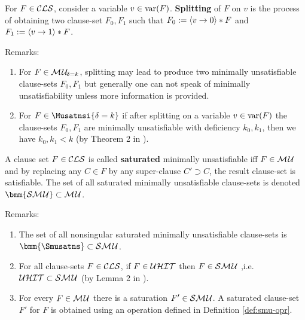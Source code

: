 \documentclass{article}
\begin{document}
\begin{defi}\label{def:splitting}
For $F \in \mathcal{CLS}$, consider a variable $v \in \operatorname{var}(F)$. \textbf{Splitting} of $F$ on $v$ is the process of obtaining two clause-set $F_0,F_1$ such that  $F_0:=\langle v \rightarrow 0 \rangle * F$ and $F_1:=\langle v \rightarrow 1 \rangle * F$.
\end{defi}
Remarks:
  \begin{enumerate}
  \item For $F \in\mathcal{M\hspace{0.8pt}U}_{\!\delta=k}$, splitting may lead to produce two minimally unsatisfiable clause-sets $F_0,F_1$ but generally one can not speak of minimally unsatisfiability unless more information is provided. 
  \item For $F \in\Musatnsi{\delta=k}$ if after splitting on a variable $v \in \operatorname{var}(F)$ the clause-sets $F_0,F_1$ are minimally unsatisfiable with deficiency $k_0, k_1$, then we have $k_0, k_1 < k$ (by Theorem 2 in \cite{KleineBuening2000SubclassesMU}).
  \end{enumerate}
\begin{defi}\label{def:smu}
A clause set $F \in \mathcal{CLS}$ is called \textbf{saturated} minimally unsatisfiable iff $F \in \mathcal{M\hspace{0.8pt}U} $ and by replacing any $C \in F$ by any super-clause $C' \supset C$, the result clause-set is satisfiable. The set of all saturated minimally unsatisfiable clause-sets is denoted $\bmm{\Smusat} \subset \Musat$.
\end{defi}
Remarks:
  \begin{enumerate}
  \item The set of all nonsingular saturated minimally unsatisfiable clause-sets is $\bmm{\Smusatns} \subset \Smusat$.
  \item For all clause-sets $F \in \mathcal{CLS}$, if $F \in \mathcal{U}\mathcal{HIT}$ then $ F \in \mathcal{S}\mathcal{M\hspace{0.8pt}U}$ ,i.e. $\mathcal{U}\mathcal{HIT} \subset \mathcal{S}\mathcal{M\hspace{0.8pt}U}$ (by Lemma 2 in \cite{KullmannZhao2012ConfluenceJ}). 
  \item For every $F \in \mathcal{M\hspace{0.8pt}U}$ there is a saturation $F' \in \mathcal{S}\mathcal{M\hspace{0.8pt}U}$. A saturated clause-set  $F'$ for $F$ is obtained using an operation defined in Definition \ref{def:smu-opr}.
  \end{enumerate}
\end{document}
